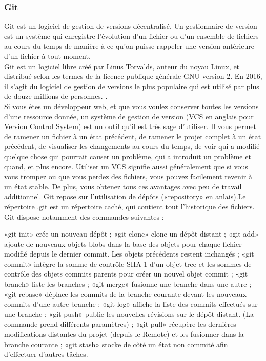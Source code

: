 \subsubsection{Git}	
Git est un logiciel de gestion de versions décentralisé. Un gestionnaire de version est un système qui enregistre l'évolution d'un fichier ou d'un ensemble de fichiers au cours du temps de manière à ce qu'on puisse rappeler une version antérieure d'un fichier à tout moment. \\
Git est un logiciel libre créé par Linus Torvalds, auteur du noyau Linux, et distribué selon les termes de la licence publique générale GNU version 2. En 2016, il s’agit du logiciel de gestion de versions le plus populaire qui est utilisé par plus de douze millions de personnes. \cite{git}. \\
Si vous êtes un développeur web, et que vous voulez conserver toutes les versions d'une ressource donnée, un système de gestion de version (VCS en anglais pour Version Control System) est un outil qu'il est très sage d'utiliser. Il vous permet de ramener un fichier à un état précédent, de ramener le projet complet à un état précédent, de visualiser les changements au cours du temps, de voir qui a modifié quelque chose qui pourrait causer un problème, qui a introduit un problème et quand, et plus encore. Utiliser un VCS signifie aussi généralement que si vous vous trompez ou que vous perdez des fichiers, vous pouvez facilement revenir à un état stable. De plus, vous obtenez tous ces avantages avec peu de travail additionnel. Git repose sur l'utilisation de dépôts («repository» en anlais).Le répertoire .git est un répertoire caché, qui contient tout l’historique des fichiers.\\
Git dispose notamment des commandes suivantes :
\begin{itemize}
	\itemcheck «git init» crée un nouveau dépôt ;
	\itemcheck «git clone» clone un dépôt distant ;
	\itemcheck «git add» ajoute de nouveaux objets blobs dans la base des objets pour chaque fichier modifié depuis le dernier commit. Les objets précédents restent inchangés ;
	\itemcheck «git commit» intègre la somme de contrôle SHA-1 d'un objet tree et les sommes de contrôle des objets commits parents pour créer un nouvel objet commit ;
	\itemcheck «git branch» liste les branches ;
	\itemcheck «git merge» fusionne une branche dans une autre ;
	\itemcheck «git rebase» déplace les commits de la branche courante devant les nouveaux commits d’une autre branche ;
	\itemcheck «git log» affiche la liste des commits effectués sur une branche ;
	\itemcheck «git push» publie les nouvelles révisions sur le dépôt distant. (La commande prend différents paramètres) ;
	\itemcheck «git pull» récupère les dernières modifications distantes du projet (depuis le Remote) et les fusionner dans la branche courante ;
	\itemcheck «git stash» stocke de côté un état non commité afin d’effectuer d’autres tâches.
\end{itemize}

